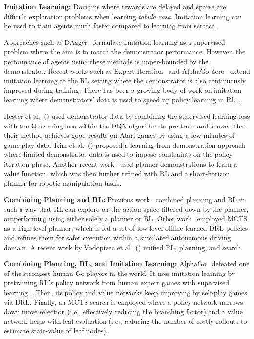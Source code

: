 \documentclass[letterpaper]{article} %
\begin{document}
\textbf{Imitation Learning:} Domains where rewards are delayed and sparse are difficult exploration problems when learning \textit{tabula rasa}. Imitation learning can be used to train agents much faster compared to learning from scratch.

Approaches such as DAgger~\cite{ross2011reduction} formulate imitation learning as a supervised problem where the aim is to match the demonstrator performance. However, the performance of agents using these methods is upper-bounded by the demonstrator. Recent works such as Expert Iteration~\cite{anthony2017thinking} and AlphaGo Zero~\cite{silver2017mastering} extend imitation learning to the RL setting where the demonstrator is also continuously improved during training. There has been a growing body of work on imitation learning where demonstrators' data is used to speed up policy learning in RL~\cite{hester2017deep}.

Hester et al.~(\citeyear{hester2017deep}) used demonstrator data by combining the supervised learning loss with the Q-learning loss within the DQN algorithm to pre-train and showed that their method achieves good results on Atari games by using a few minutes of game-play data. Kim et al.~(\citeyear{kim2013learning}) proposed a learning from demonstration approach where limited demonstrator data is used to impose constraints on the policy iteration phase. Another recent work~\cite{bejjani2018planning} used planner demonstrations to learn a value function, which was then further refined with RL and a short-horizon planner for robotic manipulation tasks.

\textbf{Combining Planning and RL:} Previous work~\cite{leonetti2016synthesis} combined planning and RL in such a way that RL can explore on the action space filtered down by the planner, outperforming using either solely a planner or RL. Other work~\cite{lee2019wisemove} employed MCTS as a high-level planner, which is fed a set of low-level offline learned DRL policies and refines them for safer execution within a simulated autonomous driving domain. A recent work by Vodopivec et al.~(\citeyear{vodopivec2017monte}) unified RL, planning, and search.

\textbf{Combining Planning, RL, and Imitation Learning:} AlphaGo~\cite{silver2016mastering} defeated one of the strongest human Go players in the world. It uses imitation learning by pretraining RL's policy network from human expert games with supervised learning~\cite{lecun2015deep}. Then, its policy and value networks keep improving by self-play games via DRL. Finally, an MCTS search is employed where a policy network narrows down move selection (i.e., effectively reducing the branching factor) and a value network helps with leaf evaluation (i.e., reducing the number of costly rollouts to estimate state-value of leaf nodes).
\end{document}
